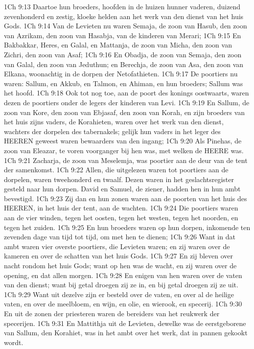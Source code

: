 1Ch 9:13  Daartoe hun broeders, hoofden in de huizen hunner vaderen, duizend zevenhonderd en zestig, kloeke helden aan het werk van den dienst van het huis Gods.
1Ch 9:14  Van de Levieten nu waren Semaja, de zoon van Hasub, den zoon van Azrikam, den zoon van Hasabja, van de kinderen van Merari;
1Ch 9:15  En Bakbakkar, Heres, en Galal, en Mattanja, de zoon van Micha, den zoon van Zichri, den zoon van Asaf;
1Ch 9:16  En Obadja, de zoon van Semaja, den zoon van Galal, den zoon van Jeduthun; en Berechja, de zoon van Asa, den zoon van Elkana, woonachtig in de dorpen der Netofathieten.
1Ch 9:17  De poortiers nu waren: Sallum, en Akkub, en Talmon, en Ahiman, en hun broeders; Sallum was het hoofd.
1Ch 9:18  Ook tot nog toe, aan de poort des konings oostwaarts, waren dezen de poortiers onder de legers der kinderen van Levi.
1Ch 9:19  En Sallum, de zoon van Kore, den zoon van Ebjasaf, den zoon van Korah, en zijn broeders van het huis zijns vaders, de Korahieten, waren over het werk van den dienst, wachters der dorpelen des tabernakels; gelijk hun vaders in het leger des HEEREN geweest waren bewaarders van den ingang;
1Ch 9:20  Als Pinehas, de zoon van Eleazar, te voren voorganger bij hen was, met welken de HEERE was.
1Ch 9:21  Zacharja, de zoon van Meselemja, was poortier aan de deur van de tent der samenkomst.
1Ch 9:22  Allen, die uitgelezen waren tot poortiers aan de dorpelen, waren tweehonderd en twaalf. Dezen waren in het geslachtsregister gesteld naar hun dorpen. David en Samuel, de ziener, hadden hen in hun ambt bevestigd.
1Ch 9:23  Zij dan en hun zonen waren aan de poorten van het huis des HEEREN, in het huis der tent, aan de wachten.
1Ch 9:24  Die poortiers waren aan de vier winden, tegen het oosten, tegen het westen, tegen het noorden, en tegen het zuiden.
1Ch 9:25  En hun broeders waren op hun dorpen, inkomende ten zevenden dage van tijd tot tijd, om met hen te dienen;
1Ch 9:26  Want in dat ambt waren vier overste poortiers, die Levieten waren; en zij waren over de kameren en over de schatten van het huis Gods.
1Ch 9:27  En zij bleven over nacht rondom het huis Gods; want op hen was de wacht, en zij waren over de opening, en dat allen morgen.
1Ch 9:28  En enigen van hen waren over de vaten van den dienst; want bij getal droegen zij ze in, en bij getal droegen zij ze uit.
1Ch 9:29  Want uit dezelve zijn er besteld over de vaten, en over al de heilige vaten, en over de meelbloem, en wijn, en olie, en wierook, en specerij.
1Ch 9:30  En uit de zonen der priesteren waren de bereiders van het reukwerk der specerijen.
1Ch 9:31  En Mattithja uit de Levieten, dewelke was de eerstgeborene van Sallum, den Korahiet, was in het ambt over het werk, dat in pannen gekookt wordt.
